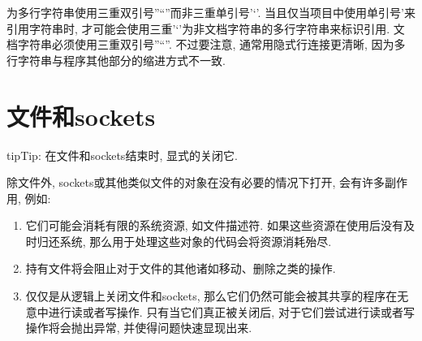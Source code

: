 \documentclass[a4paper,10pt,english]{sphinxmanual}
\begin{document}
为多行字符串使用三重双引号”“”而非三重单引号’‘’. 当且仅当项目中使用单引号’来引用字符串时, 才可能会使用三重’‘’为非文档字符串的多行字符串来标识引用. 文档字符串必须使用三重双引号”“”. 不过要注意, 通常用隐式行连接更清晰, 因为多行字符串与程序其他部分的缩进方式不一致.

%
\begin{sphinxVerbatim}[commandchars=\\\{\}]
     
\end{sphinxVerbatim}

%
\begin{sphinxVerbatim}[commandchars=\\\{\}]
       
\end{sphinxVerbatim}


\section{文件和sockets}
\label{\detokenize{python_style_rules:sockets}}
\begin{sphinxadmonition}{tip}{Tip:}
在文件和sockets结束时, 显式的关闭它.
\end{sphinxadmonition}

除文件外, sockets或其他类似文件的对象在没有必要的情况下打开, 会有许多副作用, 例如:
\begin{enumerate}
\item {} 
它们可能会消耗有限的系统资源, 如文件描述符. 如果这些资源在使用后没有及时归还系统, 那么用于处理这些对象的代码会将资源消耗殆尽.

\item {} 
持有文件将会阻止对于文件的其他诸如移动、删除之类的操作.

\item {} 
仅仅是从逻辑上关闭文件和sockets, 那么它们仍然可能会被其共享的程序在无意中进行读或者写操作. 只有当它们真正被关闭后, 对于它们尝试进行读或者写操作将会抛出异常, 并使得问题快速显现出来.

\end{enumerate}
\end{document}
